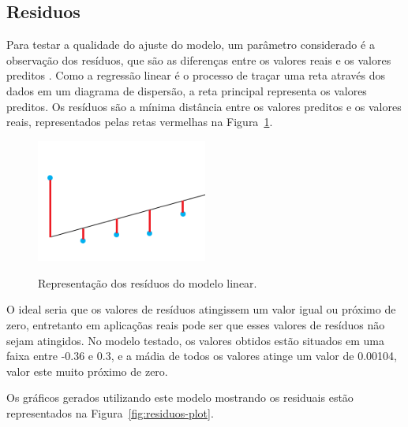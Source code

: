 \subsection{Residuos}

Para testar a qualidade do ajuste do modelo, um parâmetro considerado é a observação dos resíduos, que são as diferenças entre os valores reais e os valores preditos \cite{schneider2010linear}. Como a regressão linear é o processo de traçar uma reta através dos dados em um diagrama de dispersão, a reta principal representa os valores preditos. Os resíduos são a mínima distância entre os valores preditos e os valores reais, representados pelas retas vermelhas na Figura~\ref{fig:residuos}. 


\begin{figure}[H]
    \centering
    \caption{Representação dos resíduos do modelo linear.}
    \includegraphics[width=0.5\textwidth]{images/residuos.png}
    \label{fig:residuos}
  \end{figure}

O ideal seria que os valores de resíduos atingissem um valor igual ou próximo de zero, entretanto em aplicaçõas reais pode ser que esses valores de resíduos não sejam atingidos. No modelo testado, os valores obtidos estão situados em uma faixa entre -0.36 e 0.3, e a mádia de todos os valores atinge um valor de 0.00104, valor este muito próximo de zero.

Os gráficos gerados utilizando este modelo mostrando os residuais estão representados na Figura~\ref{fig:residuos-plot}.

